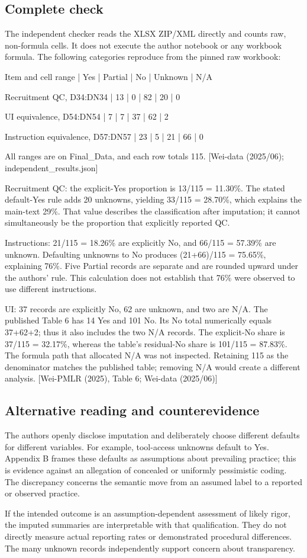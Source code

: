 \documentclass[10pt]{article}
\begin{document}
\subsection*{Complete check}
The independent checker reads the XLSX ZIP/XML directly and counts raw, non-formula cells. It does not execute the author notebook or any workbook formula. The following categories reproduce from the pinned raw workbook:\par
Item and cell range | Yes | Partial | No | Unknown | N/A\par
Recruitment QC, D34:DN34 | 13 | 0 | 82 | 20 | 0\par
UI equivalence, D54:DN54 | 7 | 7 | 37 | 62 | 2\par
Instruction equivalence, D57:DN57 | 23 | 5 | 21 | 66 | 0\par
All ranges are on Final\_Data, and each row totals 115. [Wei-data (2025/06); independent\_results.json]\par
Recruitment QC: the explicit-Yes proportion is 13/115 = 11.30\%. The stated default-Yes rule adds 20 unknowns, yielding 33/115 = 28.70\%, which explains the main-text 29\%. That value describes the classification after imputation; it cannot simultaneously be the proportion that explicitly reported QC.\par
Instructions: 21/115 = 18.26\% are explicitly No, and 66/115 = 57.39\% are unknown. Defaulting unknowns to No produces (21+66)/115 = 75.65\%, explaining 76\%. Five Partial records are separate and are rounded upward under the authors’ rule. This calculation does not establish that 76\% were observed to use different instructions.\par
UI: 37 records are explicitly No, 62 are unknown, and two are N/A. The published Table 6 has 14 Yes and 101 No. Its No total numerically equals 37+62+2; thus it also includes the two N/A records. The explicit-No share is 37/115 = 32.17\%, whereas the table’s residual-No share is 101/115 = 87.83\%. The formula path that allocated N/A was not inspected. Retaining 115 as the denominator matches the published table; removing N/A would create a different analysis. [Wei-PMLR (2025), Table 6; Wei-data (2025/06)]\par
\subsection*{Alternative reading and counterevidence}
The authors openly disclose imputation and deliberately choose different defaults for different variables. For example, tool-access unknowns default to Yes. Appendix B frames these defaults as assumptions about prevailing practice; this is evidence against an allegation of concealed or uniformly pessimistic coding. The discrepancy concerns the semantic move from an assumed label to a reported or observed practice.\par
If the intended outcome is an assumption-dependent assessment of likely rigor, the imputed summaries are interpretable with that qualification. They do not directly measure actual reporting rates or demonstrated procedural differences. The many unknown records independently support concern about transparency.\par
\end{document}
